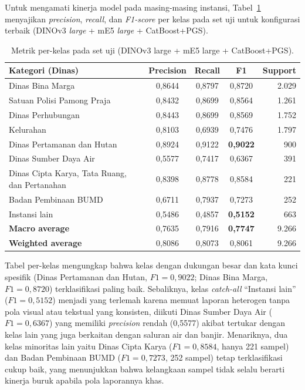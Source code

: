 Untuk mengamati kinerja model pada masing-masing instansi, Tabel~\ref{tab:per-class} menyajikan \textit{precision}, \textit{recall}, dan \textit{F1-score} per kelas pada set uji untuk konfigurasi terbaik (DINOv3 \textit{large} + mE5 \textit{large} + CatBoost+PGS).

\begin{table}[htbp]
\centering
\caption{Metrik per-kelas pada set uji (DINOv3 large + mE5 large + CatBoost+PGS).}
\label{tab:per-class}
\small\setlength{\tabcolsep}{4pt}
\begin{tabular}{l c c c r}
\toprule
\textbf{Kategori (Dinas)} & \textbf{Precision} & \textbf{Recall} & \textbf{F1} & \textbf{Support} \\
\midrule
Dinas Bina Marga & 0,8644 & 0,8797 & 0,8720 & 2.029 \\
Satuan Polisi Pamong Praja & 0,8432 & 0,8699 & 0,8564 & 1.261 \\
Dinas Perhubungan & 0,8443 & 0,8699 & 0,8569 & 1.752 \\
Kelurahan & 0,8103 & 0,6939 & 0,7476 & 1.797 \\
Dinas Pertamanan dan Hutan & 0,8924 & 0,9122 & \textbf{0,9022} & 900 \\
Dinas Sumber Daya Air & 0,5577 & 0,7417 & 0,6367 & 391 \\
Dinas Cipta Karya, Tata Ruang, dan Pertanahan & 0,8398 & 0,8778 & 0,8584 & 221 \\
Badan Pembinaan BUMD & 0,6711 & 0,7937 & 0,7273 & 252 \\
Instansi lain & 0,5486 & 0,4857 & \textbf{0,5152} & 663 \\
\midrule
\textbf{Macro average} & 0,7635 & 0,7916 & \textbf{0,7747} & 9.266 \\
\textbf{Weighted average} & 0,8086 & 0,8073 & 0,8061 & 9.266 \\
\bottomrule
\end{tabular}
\end{table}

Tabel per-kelas mengungkap bahwa kelas dengan dukungan besar dan kata kunci spesifik (Dinas Pertamanan dan Hutan, $F1 = 0{,}9022$; Dinas Bina Marga, $F1 = 0{,}8720$) terklasifikasi paling baik. Sebaliknya, kelas \textit{catch-all} ``Instansi lain'' ($F1 = 0{,}5152$) menjadi yang terlemah karena memuat laporan heterogen tanpa pola visual atau tekstual yang konsisten, diikuti Dinas Sumber Daya Air ($F1 = 0{,}6367$) yang memiliki \textit{precision} rendah (0,5577) akibat tertukar dengan kelas lain yang juga berkaitan dengan saluran air dan banjir. Menariknya, dua kelas minoritas lain yaitu Dinas Cipta Karya ($F1 = 0{,}8584$, hanya 221 sampel) dan Badan Pembinaan BUMD ($F1 = 0{,}7273$, 252 sampel) tetap terklasifikasi cukup baik, yang menunjukkan bahwa kelangkaan sampel tidak selalu berarti kinerja buruk apabila pola laporannya khas.

